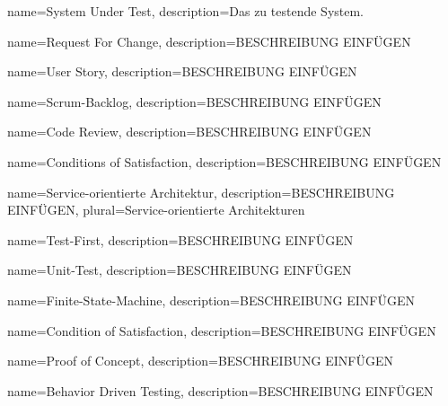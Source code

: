  {
	name={System Under Test},
	description={Das zu testende System.}
}

 {
	name={Request For Change},
	description={BESCHREIBUNG EINFÜGEN}
}

 {
	name={User Story},
	description={BESCHREIBUNG EINFÜGEN}
}

 {
	name={Scrum-Backlog},
	description={BESCHREIBUNG EINFÜGEN}
}

 {
	name={Code Review},
	description={BESCHREIBUNG EINFÜGEN}
}

 {
	name={Conditions of Satisfaction},
	description={BESCHREIBUNG EINFÜGEN}
}

 {
	name={Service-orientierte Architektur},
	description={BESCHREIBUNG EINFÜGEN},
	plural=Service-orientierte Architekturen
}


 {
	name={Test-First},
	description={BESCHREIBUNG EINFÜGEN}
}

 {
	name={Unit-Test},
	description={BESCHREIBUNG EINFÜGEN}
}

 {
	name={Finite-State-Machine},
	description={BESCHREIBUNG EINFÜGEN}
}

 {
	name={Condition of Satisfaction},
	description={BESCHREIBUNG EINFÜGEN}
}

 {
	name={Proof of Concept},
	description={BESCHREIBUNG EINFÜGEN}
}

 {
	name={Behavior Driven Testing},
	description={BESCHREIBUNG EINFÜGEN}
}